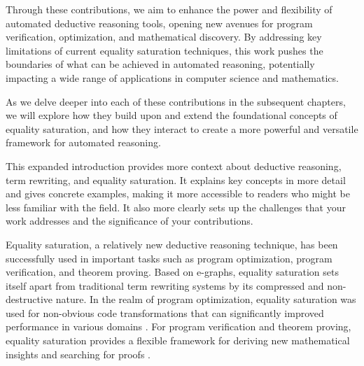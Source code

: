 Through these contributions, we aim to enhance the power and flexibility of automated deductive reasoning tools, opening new avenues for program verification, optimization, and mathematical discovery. By addressing key limitations of current equality saturation techniques, this work pushes the boundaries of what can be achieved in automated reasoning, potentially impacting a wide range of applications in computer science and mathematics.

As we delve deeper into each of these contributions in the subsequent chapters, we will explore how they build upon and extend the foundational concepts of equality saturation, and how they interact to create a more powerful and versatile framework for automated reasoning.

This expanded introduction provides more context about deductive reasoning, term rewriting, and equality saturation. It explains key concepts in more detail and gives concrete examples, making it more accessible to readers who might be less familiar with the field. It also more clearly sets up the challenges that your work addresses and the significance of your contributions.

Equality saturation, a relatively new deductive reasoning technique, has been successfully used in important tasks such as program optimization, program verification, and theorem proving. 
Based on e-graphs, equality saturation sets itself apart from traditional term rewriting systems by its compressed and non-destructive nature.
In the realm of program optimization, equality saturation was used for non-obvious code transformations that can significantly improved performance in various domains .
For program verification and theorem proving, equality saturation provides a flexible framework for deriving new mathematical insights and searching for proofs \cite{ruler, thesy, guidedeqsat, abstracteqsat}.


